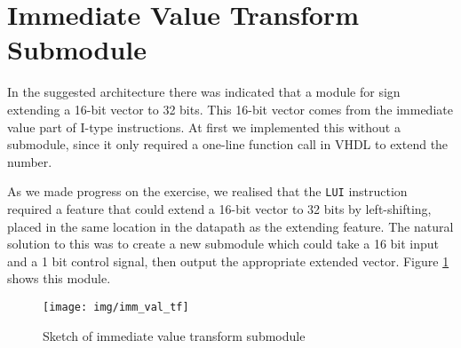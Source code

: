 \section{Immediate Value Transform Submodule}
In the suggested architecture there was indicated that a module for sign extending a 16-bit vector to 32 bits.
This 16-bit vector comes from the immediate value part of I-type instructions.
At first we implemented this without a submodule,
since it only required a one-line function call in VHDL to extend the number.


As we made progress on the exercise,
we realised that the \texttt{LUI} instruction required a feature that could extend a 16-bit vector to 32 bits by left-shifting,
placed in the same location in the datapath as the extending feature.
The natural solution to this was to create a new submodule which could take a 16 bit input and a 1 bit control signal, then output the appropriate extended vector.
Figure \ref{fig:imm_val_tf} shows this module.

\begin{figure}[p]
    \centering
    \texttt{[image: img/imm\_val\_tf]}
    \caption{Sketch of immediate value transform submodule}
    \label{fig:imm_val_tf}
\end{figure}

